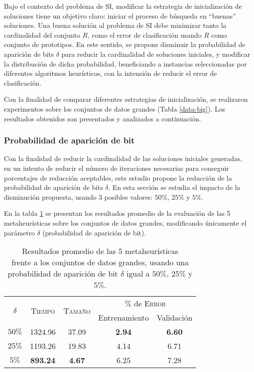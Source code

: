 Bajo el contexto del problema de SI, modificar la estrategia de inicialización de soluciones tiene un objetivo claro: iniciar el proceso de búsqueda en ``buenas'' soluciones. Una buena solución al problema de SI debe minimizar tanto la cardinalidad del conjunto $R$, como el error de clasificación usando $R$ como conjunto de prototipos. En este sentido, se propone disminuir la probabilidad de aparición de bits $\delta$ para reducir la cardinalidad de soluciones iniciales, y modificar la distribución de dicha probabilidad, beneficiando a instancias seleccionadas por diferentes algoritmos heurísticos, con la intensión de reducir el error de clasificación.

Con la finalidad de comparar diferentes estrategias de inicialización, se realizaron experimentos sobre los conjuntos de datos grandes (Tabla \ref{data-big}). Los resultados obtenidos son presentados y analizados a continuación.

\subsubsection{Probabilidad de aparición de bit}

Con la finalidad de reducir la cardinalidad de las soluciones iniciales generadas, en un intento de reducir el número de iteraciones necesarias para conseguir porcentajes de reducción aceptables, este estudio propone la reducción de la probabilidad de aparición de bits $\delta$. En esta sección se estudia el impacto de la disminución propuesta, usando 3 posibles valores: $50\%$, $25\%$ y $5\%$.

En la tabla \ref{table-unif} se presentan los resultados promedio de la evaluación de las 5 metaheurísticas sobre los conjuntos de datos grandes, modificando únicamente el parámetro $\delta$ (probabilidad de aparición de bit).

\begin{table}[h!]
\centering
\begin{tabular}{c c c c c}
\hline
\multirow{2}{*}{$\delta$}
	& \multirow{2}{*}{\textsc{Tiempo}}
	& \multirow{2}{*}{\textsc{Tamaño}}
	& \multicolumn{2}{c}{$\%$ de \textsc{Error}} \\\cline{4-5}
 & & & \scriptsize{Entrenamiento} & \scriptsize{Validación} \\
\hline
\hline
$50\%$ & 1324.96 & 37.09 & \textbf{2.94} & \textbf{6.60} \\
$25\%$ & 1193.26 & 19.83 & 4.14 & 6.71 \\
$5\%$  & \textbf{893.24} & \textbf{4.67} & 6.25 & 7.28 \\
\hline
\end{tabular}
\caption[Resultados modificando la probabilidad de aparición de bit]{Resultados promedio de las 5 metaheurísticas\\frente a los conjuntos de datos grandes, usando una\\probabilidad de aparición de bit $\delta$ igual a $50\%$, $25\%$ y $5\%$.}
\label{table-unif}
\end{table}

